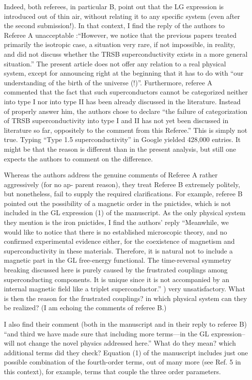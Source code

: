 \documentclass[11pt]{article}
\begin{document}
Indeed, both referees, in particular B, point out that the LG expression
is introduced out of thin air, without relating it to any specific
system (even after the second submission!). In that context, I find the
reply of the authors to Referee A unacceptable :``However, we notice
that the previous papers treated primarily the isotropic case, a
situation very rare, if not impossible, in reality, and did not discuss
whether the TRSB superconductivity exists in a more general situation.''
The present article does not offer any relation to a real physical
system, except for announcing right at the beginning that it has to do
with ``our understanding of the birth of the universe (!)''.
Furthermore, referee A commented that the fact that such superconductors
cannot be categorized neither into type I nor into type II has been
already discussed in the literature. Instead of properly answer him, the
authors chose to declare ``the failure of categorization of TRSB
superconductivity into type I and II has not yet been discussed in
literature so far, oppositely to the comment from this Referee.'' This
is simply not true. Typing ``Type 1.5 superconductivity'' in Google
yielded 428,000 entries. It might be that the reason is different than
in the present analysis, but still one expects the authors to comment on
the difference.

Whereas the authors address the genuine comments of Referee A rather
aggressively (for no ap- parent reason), they treat Referee B extremely
politely, but nonetheless, fail to supply the required clarifications.
For example, referee B pointed out the possibility of a magnetic order
in the pnictides, which is not included in the GL expression (1) of the
manuscript. As the only physical system they mention is the iron
pnictides, I find the authors' reply ``Meanwhile, we would like to
notice that there is no established microscopic theory, and no confirmed
experimental evidence either, for the coexistence of magnetism and
superconductivity in these materials. Therefore, it is natural not to
include a magnetic part in the GL free-energy functional. The
time-reversal symmetry breaking discussed here is purely caused by the
frustrated couplings among superconducting components. It is unique
since it is not accompanied by an internal magnetic field like a triplet
superconductor.'' ) very unsatisfactory. What is then the reason for the
frustrated couplings? in which physical system can they be realized? (I
am echoing the comments of referee B.)

I also find their comment (both in the manuscript and in their reply to
referee B) ``and third we have made sure that including more terms---in
the GL expression-- will not change the novel physics addressed here.''
What do they mean? which additional terms did they check? Equation (1)
of the manuscript includes just one possible combination of the
fourth-order terms, out of many more (see Ref. 5 in this context), for
example, terms that couple the three order parameters.
\end{document}
